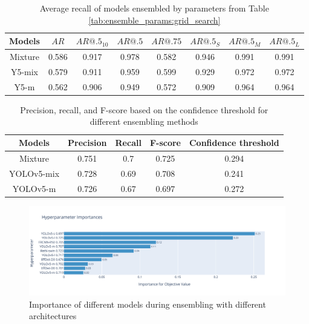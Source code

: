 \begin{table}[h]
    \centering
    \begin{tabular}{|c|c|c|c|c|c|c|c|}
        \hline
        Models  & $AR$  & $AR@.5_{10}$ & $AR@.5$ & $AR@.75$ & $AR@.5_S$ & $AR@.5_M$ & $AR@.5_L$ \\ \hline
        Mixture & 0.586 & 0.917        & 0.978   & 0.582    & 0.946     & 0.991     & 0.991     \\ \hline
        Y5-mix  & 0.579 & 0.911        & 0.959   & 0.599    & 0.929     & 0.972     & 0.972     \\ \hline
        Y5-m    & 0.562 & 0.906        & 0.949   & 0.572    & 0.909     & 0.964     & 0.964     \\ \hline
    \end{tabular}
    \caption{Average recall of models ensembled by parameters from Table \ref{tab:ensemble_params:grid_search}}
    \label{tab:recall:ensemble_compare}
\end{table}


\begin{table}[h]
    \begin{tabular}{|c|c|c|c|c|}
        \hline
        Models     & Precision & Recall & F-score & Confidence threshold \\ \hline
        Mixture    & 0.751     & 0.7    & 0.725   & 0.294                \\ \hline
        YOLOv5-mix & 0.728     & 0.69   & 0.708   & 0.241                \\ \hline
        YOLOv5-m   & 0.726     & 0.67   & 0.697   & 0.272                \\ \hline
    \end{tabular}
    \caption{Precision, recall, and F-score based on the confidence threshold for different ensembling methods}
    \label{tab:ensembling_prf:ensemble compare}
\end{table}

\begin{figure}
    \centering
    \includegraphics[width=\linewidth]{images/ensemble_all_importance.pdf}
    \caption{Importance of different models during ensembling with different architectures}
    \label{fig:ensembling_parameters_importance}
\end{figure}


